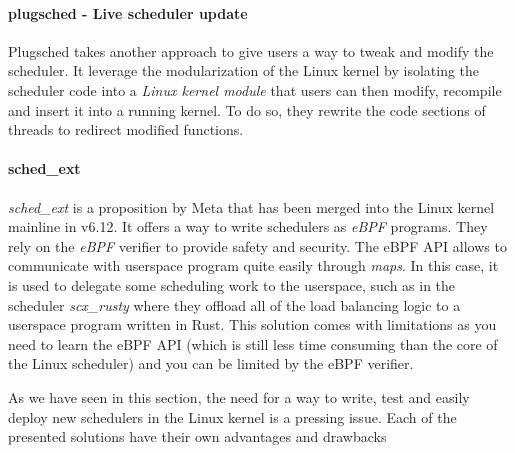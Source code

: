 \paragraph{plugsched - Live scheduler update}
\par Plugsched takes another approach to give users a way to tweak and modify the scheduler. It leverage the modularization of the Linux kernel by isolating the scheduler code into a \textit{Linux kernel module} that users can then modify, recompile and insert it into a running kernel. To do so, they rewrite the code sections of threads to redirect modified functions. 

\paragraph{sched\_ext}
\par \textit{sched\_ext} is a proposition by Meta that has been merged into the Linux kernel mainline in v6.12. It offers a way to write schedulers as \textit{eBPF} programs. They rely on the \textit{eBPF} verifier to provide safety and security. The eBPF API allows to communicate with userspace program quite easily through \textit{maps}. In this case, it is used to delegate some scheduling work to the userspace, such as in the scheduler \textit{scx\_rusty} where they offload all of the load balancing logic to a userspace program written in Rust. This solution comes with limitations as you need to learn the eBPF API (which is still less time consuming than the core of the Linux scheduler) and you can be limited by the eBPF verifier.


\par As we have seen in this section, the need for a way to write, test and easily deploy new schedulers in the Linux kernel is a pressing issue. Each of the presented solutions have their own advantages and drawbacks